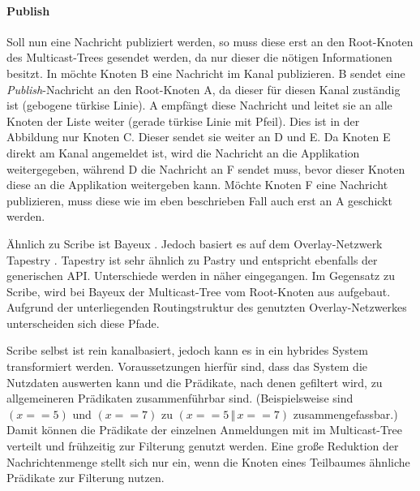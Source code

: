 \paragraph{Publish}
Soll nun eine Nachricht publiziert werden, so muss diese erst an den Root-Knoten des Multicast-Trees gesendet werden, da nur dieser die nötigen Informationen besitzt. In  möchte Knoten B eine Nachricht im Kanal publizieren. B sendet eine \emph{Publish}-Nachricht an den Root-Knoten A, da dieser für diesen Kanal zuständig ist (gebogene türkise Linie). A empfängt diese Nachricht und leitet sie an alle Knoten der Liste weiter (gerade türkise Linie mit Pfeil). Dies ist in der Abbildung nur Knoten C. Dieser sendet sie weiter an D und E. Da Knoten E direkt am Kanal angemeldet ist, wird die Nachricht an die Applikation weitergegeben, während D die Nachricht an F sendet muss, bevor dieser Knoten diese an die Applikation weitergeben kann. Möchte Knoten F eine Nachricht publizieren, muss diese wie im eben beschrieben Fall auch erst an A geschickt werden.

Ähnlich zu Scribe ist Bayeux \cite{Zhuang2001}. Jedoch basiert es auf dem Overlay-Netzwerk Tapestry \cite{Zhao2004Tapestry}. Tapestry ist sehr ähnlich zu Pastry und entspricht ebenfalls der generischen API. Unterschiede werden in  näher eingegangen. Im Gegensatz zu Scribe, wird bei Bayeux der Multicast-Tree vom Root-Knoten aus aufgebaut. Aufgrund der unterliegenden Routingstruktur des genutzten Overlay-Netzwerkes unterscheiden sich diese Pfade.

Scribe selbst ist rein kanalbasiert, jedoch kann es in ein hybrides System transformiert werden. Voraussetzungen hierfür sind, dass das System die Nutzdaten auswerten kann und die Prädikate, nach denen gefiltert wird, zu allgemeineren Prädikaten zusammenführbar sind. (Beispielsweise sind $(x == 5)$ und $(x == 7)$ zu $(x == 5\,\Vert\,x == 7)$ zusammengefassbar.) Damit können die Prädikate der einzelnen Anmeldungen mit im Multicast-Tree verteilt und frühzeitig zur Filterung genutzt werden. Eine große Reduktion der Nachrichtenmenge stellt sich nur ein, wenn die Knoten eines Teilbaumes ähnliche Prädikate zur Filterung nutzen.
